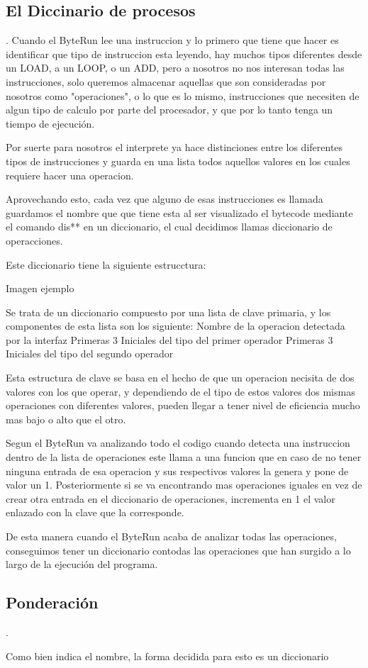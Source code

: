 \subsection{El Diccinario de procesos}.
Cuando el ByteRun lee una instruccion y lo primero que tiene que hacer es identificar que tipo de instruccion esta leyendo, hay muchos tipos diferentes desde un LOAD, a un LOOP, o un ADD, pero a nosotros no nos interesan todas las instrucciones, solo queremos almacenar aquellas que son consideradas por nosotros como "operaciones", o lo que es lo mismo, instrucciones que necesiten de algun tipo de calculo por parte del procesador, y que por lo tanto tenga un tiempo de ejecución.

Por suerte para nosotros el interprete ya hace distinciones entre los diferentes tipos de instrucciones y guarda en una lista todos aquellos valores en los cuales requiere hacer una operacion.

Aprovechando esto, cada vez que alguno de esas instrucciones es llamada guardamos el nombre que que tiene esta al ser visualizado el bytecode mediante el comando dis** en un diccionario, el cual decidimos llamas diccionario de operacciones.

Este diccionario tiene la siguiente estrucctura:

Imagen ejemplo

Se trata de un diccionario compuesto por una lista de clave primaria, y los componentes de esta lista son los siguiente:
Nombre de la operacion detectada por la interfaz
Primeras 3 Iniciales del tipo del primer operador 
Primeras 3 Iniciales del tipo del segundo operador 

Esta estructura de clave se basa en el hecho de que un operacion necisita de dos valores con los que operar, y dependiendo de el tipo de estos valores dos mismas operaciones con diferentes valores, pueden llegar a tener nivel de eficiencia mucho mas bajo o alto que el otro. 

Segun el ByteRun va analizando todo el codigo cuando detecta una instruccion dentro de la lista de operaciones este llama a una funcion que en caso de  no tener ninguna entrada de esa operacion y sus respectivos valores la genera y pone de valor un 1. Posteriormente si se va encontrando mas operaciones iguales en vez de  crear otra entrada en el diccionario de operaciones, incrementa en 1 el valor enlazado con la clave que la corresponde.

De esta manera cuando el ByteRun acaba de analizar todas las operaciones, conseguimos tener un diccionario contodas las operaciones que han surgido a lo largo de la ejecución del programa.

\subsection{Ponderación}.

Como bien indica el nombre, la forma decidida para esto es un diccionario